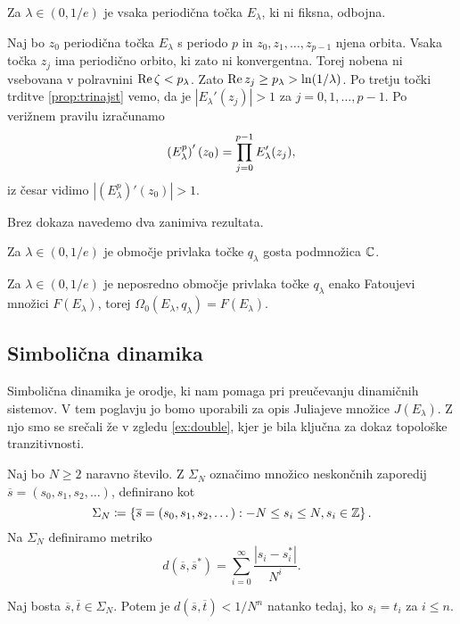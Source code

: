 \begin{posledica}
    Za \(\lambda \in (0, 1/e)\) je vsaka periodična točka \(E_\lambda\), ki ni fiksna, odbojna.
\end{posledica}

\begin{dokaz}
    Naj bo \(z_0\) periodična točka \(E_\lambda\) s periodo \(p\) in \(z_0, z_1, \dots, z_{p - 1}\) njena orbita. Vsaka točka \(z_j\) ima periodično orbito, ki zato ni konvergentna. Torej nobena ni vsebovana v polravnini \(\operatorname{Re} \zeta < p_\lambda\). Zato \(\operatorname{Re} z_j \geq p_\lambda > \ln (1 / \lambda)\). Po tretju točki trditve \ref{prop:trinajst} vemo, da je \(|E_\lambda' (z_j)| > 1\) za \(j = 0, 1, \dots, p - 1\). Po verižnem pravilu izračunamo
    \[\left( E_\lambda^p \right)' (z_0) = \prod_{j = 0}^{p - 1} E_\lambda' (z_j),\]
    iz česar vidimo \(|(E_\lambda^p)' (z_0)| > 1\).
\end{dokaz}

Brez dokaza navedemo dva zanimiva rezultata.

\begin{trditev}
    Za \(\lambda \in (0, 1/e)\) je območje privlaka točke \(q_\lambda\) gosta podmnožica \(\mathbb C\).
\end{trditev}

\begin{izrek}
    Za \(\lambda \in (0, 1/e)\) je neposredno območje privlaka točke \(q_\lambda\) enako Fatoujevi množici \(F (E_\lambda)\), torej \(\Omega_0 (E_\lambda, q_\lambda) = F (E_\lambda)\).
\end{izrek}

\subsection{Simbolična dinamika}

Simbolična dinamika je orodje, ki nam pomaga pri preučevanju dinamičnih sistemov. V tem poglavju jo bomo uporabili za opis Juliajeve množice \(J (E_\lambda)\). Z njo smo se srečali že v zgledu \ref{ex:double}, kjer je bila ključna za dokaz topološke tranzitivnosti.

Naj bo \(N \geq 2\) naravno število. Z \(\Sigma_N\) označimo množico neskončnih zaporedij \(\overline{s} = (s_0, s_1, s_2, \dots)\), definirano kot
\[\Sigma_N \coloneq \left\{ \overline{s} = (s_0, s_1, s_2, \dots) : - N \leq s_i \leq N, s_i \in \mathbb Z \right\}.\]
Na \(\Sigma_N\) definiramo metriko
\[d (\overline{s}, \overline{s}^*) = \sum_{i = 0}^{\infty} \frac{|s_i - s_i^*|}{N^i}.\]

\begin{izrek} \label{thm:blizu}
    Naj bosta \(\overline{s}, \overline{t} \in \Sigma_N\). Potem je \(d(\overline{s}, \overline{t}) < 1/N^n\) natanko tedaj, ko \(s_i = t_i\) za \(i \leq n\).
\end{izrek}

